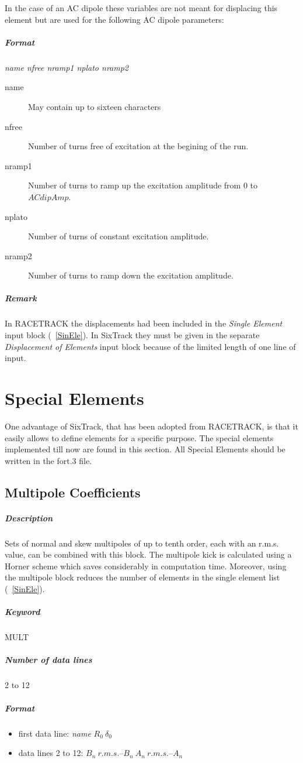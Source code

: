 \documentclass[a4paper,11pt]{report}
\begin{document}
In the case of an AC dipole these variables are not meant for
displacing this element but are used for the following AC dipole
parameters:
\subparagraph{Format} {\em name nfree nramp1 nplato nramp2}
\begin{description}
\item [name] May contain up to sixteen characters
\item [nfree] Number of turns free of excitation at the begining of
  the run.
\item [nramp1] Number of turns to ramp up the excitation amplitude 
  from 0 to $ACdipAmp$.
\item [nplato] Number of turns of constant excitation amplitude. 
\item [nramp2] Number of turns to ramp down the excitation amplitude.
\end{description}

\subparagraph{Remark} In RACETRACK the displacements had been included
in the {\em Single Element} \/input block (~\ref{SinEle}). In SixTrack
they must be given in the separate {\em Displacement of Elements}
\/input block because of the limited length of one line of input.

\section{Special Elements}

One advantage of SixTrack, that has been adopted from RACETRACK, is
that it easily allows to define elements for a specific purpose. The
special elements implemented till now are found in this section.
All Special Elements should be written in the fort.3 file.

\subsection{Multipole Coefficients} \label{MulCoe}

\subparagraph{Description}

Sets of normal and skew multipoles of up to tenth order, each with an
r.m.s. value, can be combined with this block. The multipole kick is
calculated using a Horner scheme which saves considerably in
computation time. Moreover, using the multipole block reduces the
number of elements in the single element list (~\ref{SinEle}).

\subparagraph{Keyword} MULT \subparagraph{Number of data lines} 2 to
12

\subparagraph{Format}
\begin{itemize}
\item first data line: {\em name} \/$ R_{0}\ \delta_{0} $
\item data lines 2 to 12: $ B_{n}\ r.m.s.$--$B_{n}\ A_{n}\ r.m.s.$--$A_{n} $
\end{itemize}
\end{document}
